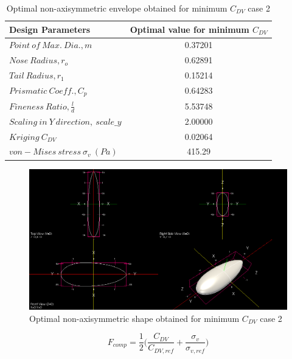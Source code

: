 \begin{table}[H]
	\centering
	\caption{Optimal non-axisymmetric envelope obtained for minimum $ C_{DV} $ case 2}
	\label{Optimal non-axisymmetric body obtained for mimimum Cdv case 2}
	\begin{tabular}{lc}
		\hline \hline
		Design Parameters & Optimal value for minimum $ C_{DV} $    \\ \hline \hline
		$ Point\ of\ Max.\ Dia., m$ & 0.37201      \\  
		$ Nose\ Radius, r _{o} $ & 0.62891    \\
		$ Tail\ Radius, r _{1} $ & 0.15214     \\  
		$ Prismatic\ Coeff., C _{p }$ & 0.64283 \\
		$ Fineness\ Ratio, \frac{l}{d} $ &5.53748 \\
		$Scaling\ in\ Y\ direction,\ scale\_y$ & 2.00000 \\ \hline \hline
		
		
		$ Kriging\ C_{DV} $ & 0.02064 \\
		$ von-Mises\ stress\  \sigma _{v} \ (Pa) $ & 415.29 \\
		
		\hline \hline
	\end{tabular}
\end{table}
 
\begin{figure}[H]
	\centering
	\includegraphics[width=450 pt]{rnd/min_cdv_case2.png}
	\caption{Optimal non-axisymmetric shape obtained for minimum $ C_{DV} $ case 2}
	\label{Optimal C DV non axi case 2} %
\end{figure}

\begin{equation}
F_{comp} = \frac{1}{2}\bigg( \frac{C_{DV}}{C_{DV,ref}} + \dfrac{\sigma _{v}}{\sigma _{v,ref}} \bigg)
\end{equation}


